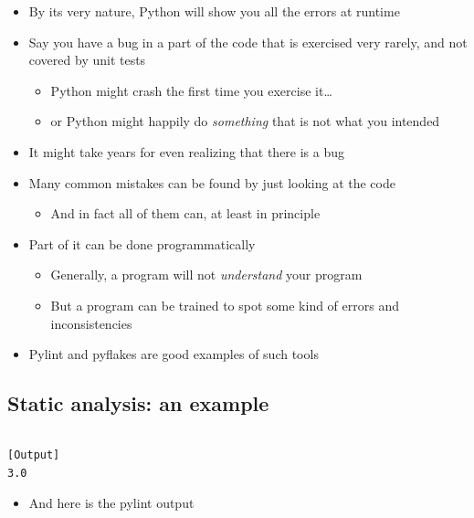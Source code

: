   \begin{itemize}
  \item By its very nature, Python will show you all the errors at runtime
  \item Say you have a bug in a part of the code that is exercised very rarely,
    and not covered by unit tests
    \begin{itemize}
    \item Python might crash the first time you exercise it\ldots
    \item or Python might happily do \emph{something} that is not what you
      intended
    \end{itemize}
  \item \alert{It might take years for even realizing that there is a bug}
  \item Many common mistakes can be found by just looking at the code
    \begin{itemize}
    \item And in fact all of them can, at least in principle
    \end{itemize}
  \item Part of it can be done programmatically
    \begin{itemize}
    \item Generally, a program will not \emph{understand} your program
    \item But a program can be trained to spot some kind of
      errors and inconsistencies
    \end{itemize}
  \item Pylint and pyflakes are good examples of such tools
  \end{itemize}

\subsection{Static analysis: an example}

\inputminted{python}{snippets/linting1.py}

\begin{verbatim}
[Output]
3.0
\end{verbatim} 

  \begin{itemize}
  \item And here is the pylint output
  \end{itemize}
  
